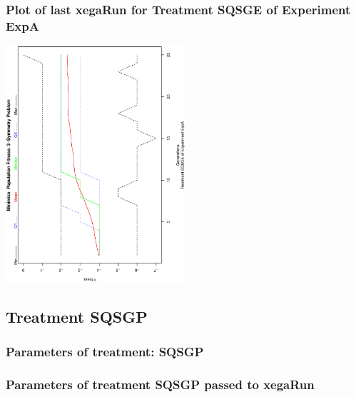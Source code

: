 \documentclass[18pt,c]{beamer}
\makeatletter
\def\beamer@writeslidentry@miniframesoff{%
  \expandafter\beamer@ifempty\expandafter{\beamer@framestartpage}{}%
  {%
   \clearpage\beamer@notesactions%
  }
}
\newcommand*{\miniframesoff}{\let\beamer@writeslidentry=\beamer@writeslidentry@miniframesoff}
\makeatother
\begin{document}
 \begin{frame}
 \frametitle{ Plot of last xegaRun for Treatment SQSGE of Experiment ExpA }
 \begin{center}
\includegraphics[width=0.5\textwidth, angle=-90]
{ExpAPlotPopStatsFigure003.eps}
 \end{center}
 \label{report/ExpAPlotPopStatsFigure003.eps}  
 \end{frame}

\miniframesoff
\subsection{Treatment SQSGP}

 \begin{frame}
 \fontsize{8pt}{9pt}\selectfont
 \frametitle{  Parameters of treatment: SQSGP 
 }

 \label{ExpAtParmTable016.tex}  
 \end{frame}


 \begin{frame}
 \fontsize{8pt}{9pt}\selectfont
 \frametitle{  Parameters of treatment SQSGP passed to xegaRun
 }

 \label{ExpAtParmTable017.tex}  
 \end{frame}
\end{document}
